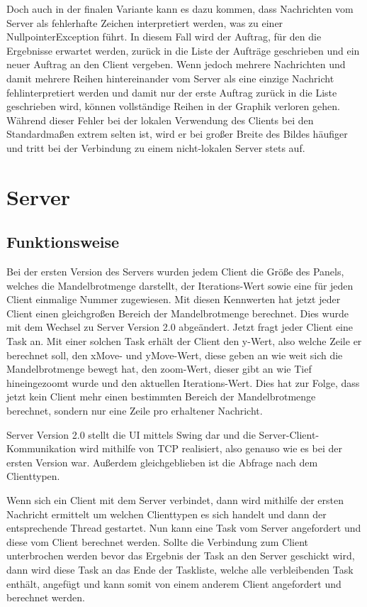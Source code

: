 \documentclass[12pt, onecolumn,notitlepage]{scrartcl}
\begin{document}
Doch auch in der finalen Variante kann es dazu kommen, dass Nachrichten vom Server als fehlerhafte Zeichen interpretiert werden, was zu einer NullpointerException führt. In diesem Fall wird der Auftrag, für den die Ergebnisse erwartet werden, zurück in die Liste der Aufträge geschrieben und ein neuer Auftrag an den Client vergeben. Wenn jedoch mehrere Nachrichten und damit mehrere Reihen hintereinander vom Server als eine einzige Nachricht fehlinterpretiert werden und damit nur der erste Auftrag zurück in die Liste geschrieben wird, können vollständige Reihen in der Graphik verloren gehen. Während dieser Fehler bei der lokalen Verwendung des Clients bei den Standardmaßen extrem selten ist, wird er bei großer Breite des Bildes häufiger und tritt bei der Verbindung zu einem nicht-lokalen Server stets auf.


\section{Server}
\subsection{Funktionsweise}
Bei der ersten Version des Servers wurden jedem Client die Größe des Panels, welches die Mandelbrotmenge darstellt, der Iterations-Wert sowie eine für jeden Client einmalige Nummer zugewiesen. Mit diesen Kennwerten hat jetzt jeder Client einen gleichgroßen Bereich der Mandelbrotmenge berechnet. Dies wurde mit dem Wechsel zu Server Version 2.0 abgeändert. Jetzt fragt jeder Client eine Task an. Mit einer solchen Task erhält der Client den y-Wert, also welche Zeile er berechnet soll, den xMove- und yMove-Wert, diese geben an wie weit sich die Mandelbrotmenge bewegt hat, den zoom-Wert, dieser gibt an wie Tief hineingezoomt wurde und den aktuellen Iterations-Wert. Dies hat zur Folge, dass jetzt kein Client mehr einen bestimmten Bereich der Mandelbrotmenge berechnet, sondern nur eine Zeile pro erhaltener Nachricht. \par
Server Version 2.0 stellt die UI mittels Swing dar und die Server-Client-Kommunikation wird mithilfe von TCP realisiert, also genauso wie es bei der ersten Version war. Außerdem gleichgeblieben ist die Abfrage nach dem Clienttypen. \par
Wenn sich ein Client mit dem Server verbindet, dann wird mithilfe der ersten Nachricht ermittelt um welchen Clienttypen es sich handelt und dann der entsprechende Thread gestartet. Nun kann eine Task vom Server angefordert und diese vom Client berechnet werden. Sollte die Verbindung zum Client unterbrochen werden bevor das Ergebnis der Task an den Server geschickt wird, dann wird diese Task an das Ende der Taskliste, welche alle verbleibenden Task enthält, angefügt und kann somit von einem anderem Client angefordert und berechnet werden.
\end{document}
